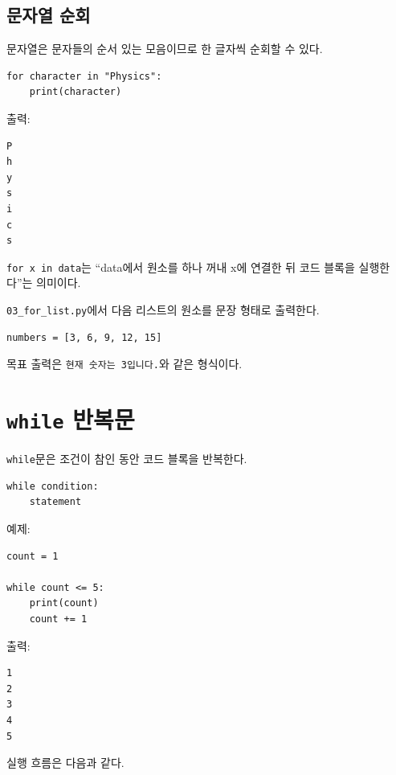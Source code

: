 \documentclass[11pt,a4paper]{article}
\begin{document}
\subsection{문자열 순회}

문자열은 문자들의 순서 있는 모음이므로 한 글자씩 순회할 수 있다.

\begin{lstlisting}
for character in "Physics":
    print(character)
\end{lstlisting}

출력:

\begin{verbatim}
P
h
y
s
i
c
s
\end{verbatim}

\begin{importantbox}
\texttt{for x in data}는 ``data에서 원소를 하나 꺼내 x에 연결한 뒤 코드 블록을 실행한다''는 의미이다.
\end{importantbox}

\begin{practicebox}
\texttt{03\_for\_list.py}에서 다음 리스트의 원소를 문장 형태로 출력한다.
\begin{lstlisting}
numbers = [3, 6, 9, 12, 15]
\end{lstlisting}
목표 출력은 \texttt{현재 숫자는 3입니다.}와 같은 형식이다.
\end{practicebox}

\section{\texttt{while} 반복문}

\texttt{while}문은 조건이 참인 동안 코드 블록을 반복한다.

\begin{lstlisting}
while condition:
    statement
\end{lstlisting}

예제:

\begin{lstlisting}
count = 1

while count <= 5:
    print(count)
    count += 1
\end{lstlisting}

출력:

\begin{verbatim}
1
2
3
4
5
\end{verbatim}

실행 흐름은 다음과 같다.
\end{document}

